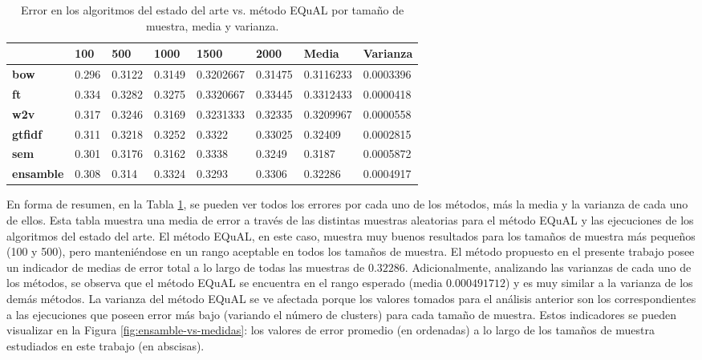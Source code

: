 \begin{table}[h!]
	\footnotesize
	\caption{Error en los algoritmos del estado del arte vs. método EQuAL por tamaño de muestra, media y varianza.}
	\begin{tabularx}{\textwidth}{XXXXXXXX}
		\toprule
		& \textbf{100} & \textbf{500} & \textbf{1000} & \textbf{1500} & \textbf{2000} & \textbf{Media} & \textbf{Varianza} \\
		\midrule
		\textbf{bow}      & 0.296 & 0.3122 & 0.3149 & 0.3202667 & 0.31475 & \cellcolor[HTML]{D9EAD3}0.3116233 & 0.0003396                          \\
		\textbf{ft}       & 0.334 & 0.3282 & 0.3275 & 0.3320667 & 0.33445 & 0.3312433                         & \cellcolor[HTML]{D9EAD3}0.0000418 \\
		\textbf{w2v}      & 0.317 & 0.3246 & 0.3169 & 0.3231333 & 0.32335 & 0.3209967                         & 0.0000558                         \\
		\textbf{gtfidf}   & 0.311 & 0.3218 & 0.3252 & 0.3322       & 0.33025 & 0.32409                              & 0.0002815                              \\
		\textbf{sem}      & 0.301 & 0.3176 & 0.3162 & 0.3338       & 0.3249  & 0.3187                               & 0.0005872                                \\
		\textbf{ensamble} & 0.308 & 0.314  & 0.3324 & 0.3293       & 0.3306  & 0.32286                              & 0.0004917                              \\
		\bottomrule
	\end{tabularx}
	\label{tab:error-arte-equal}
\end{table}

\bigskip En forma de resumen, en la Tabla \ref{tab:error-arte-equal}, se pueden ver todos los errores por cada uno de los métodos, más la media y la varianza de cada uno de ellos. Esta tabla muestra una media de error a través de las distintas muestras aleatorias para el método EQuAL y las ejecuciones de los algoritmos del estado del arte. El método EQuAL, en este caso, muestra muy buenos resultados para los tamaños de muestra más pequeños (100 y 500), pero manteniéndose en un rango aceptable en todos los tamaños de muestra. El método propuesto en el presente trabajo posee un indicador de medias de error total a lo largo de todas las muestras de \(0.32286\). Adicionalmente, analizando las varianzas de cada uno de los métodos, se observa que el método EQuAL se encuentra en el rango esperado (media \(0.000491712\)) y es muy similar a la varianza de los demás métodos. La varianza del método EQuAL se ve afectada porque los valores tomados para el análisis anterior son los correspondientes a las ejecuciones que poseen error más bajo (variando el número de clusters) para cada tamaño de muestra. Estos indicadores se pueden visualizar en la Figura \ref{fig:ensamble-vs-medidas}: los valores de error promedio (en ordenadas) a lo largo de los tamaños de muestra estudiados en este trabajo (en abscisas).

